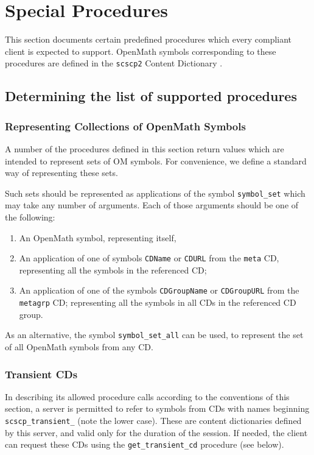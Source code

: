 \documentclass{amsart}
\begin{document}
\section{Special Procedures}\label{spec-proc}

This section documents certain predefined procedures which every
compliant client is expected to support. OpenMath symbols corresponding
to these procedures are defined in the \verb|scscp2| Content
Dictionary \cite{scscp2}.

\subsection{Determining the list of supported procedures}

\subsubsection {Representing Collections of OpenMath Symbols}

A number of the procedures defined in this section return values which
are intended to represent sets of OM symbols. For convenience, we
define a standard way of representing these sets. 

Such sets should be represented as applications of the symbol
\verb|symbol_set| which may take any number of arguments. Each of those
arguments should be one of the following:

\begin{enumerate}
\item An OpenMath symbol, representing itself,
\item An application of one of symbols \verb|CDName| or \verb|CDURL|
      from the \verb|meta| CD, representing all the symbols in the referenced CD;
\item An application of one of the symbols \verb|CDGroupName| or
      \verb|CDGroupURL| from the \verb|metagrp| CD;
      representing all the symbols in all CDs in the referenced CD group.
\end{enumerate}

As an alternative, the symbol \verb|symbol_set_all| can be used, to
represent the set of all OpenMath symbols from any CD.

\subsubsection {Transient CDs}\label{sec_special_transient}

In describing its allowed procedure calls according to the conventions
of this section, a server is permitted to refer to symbols from CDs with
names beginning \verb|scscp_transient_| (note the lower case). 
These are content dictionaries
defined by this server, and valid only for the duration of the
session. If needed, the client can request these CDs using the
\verb|get_transient_cd| procedure (see below).
\end{document}
